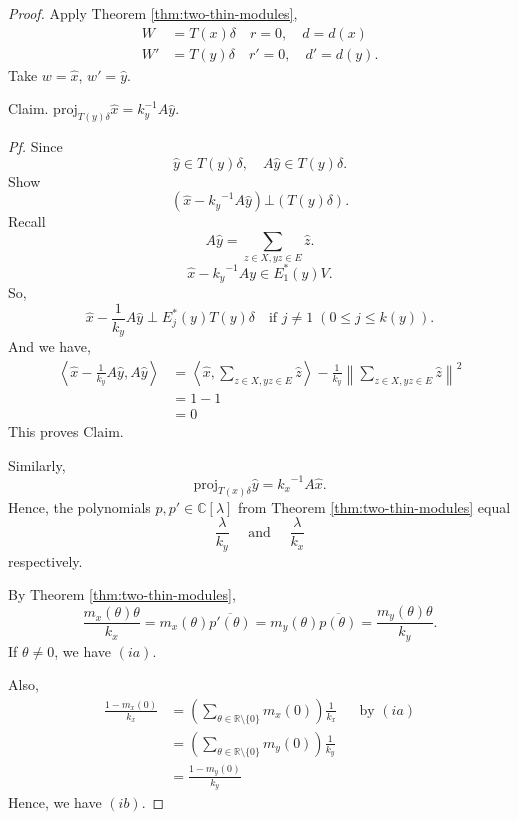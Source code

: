 \documentclass[
]{book}
\theoremstyle{definition}
\theoremstyle{definition}
\theoremstyle{definition}
\theoremstyle{definition}
\theoremstyle{remark}
\begin{document}
\begin{proof}
Apply Theorem \ref{thm:two-thin-modules},
\begin{align}
W & = T(x)\delta \quad r = 0, \quad d = d(x)\\
W' & = T(y)\delta \quad r' = 0, \quad d' = d(y).
\end{align}
Take \(w = \hat{x}\), \(w' = \hat{y}\).

Claim. \(\mathrm{proj}_{T(y)\delta}\hat{x} = k^{-1}_yA\hat{y}\).

\emph{Pf.}
Since
\[\hat{y}\in T(y)\delta, \quad A\hat{y}\in T(y)\delta.\]
Show
\[(\hat{x} - {k_y}^{-1} A\hat{y}) \bot (T(y)\delta).\]
Recall
\[A\hat{y} = \sum_{z\in X, yz\in E}\hat{z}.\]
\[\hat{x} - {k_y}^{-1}Ay \in E^*_1(y)V.\]
So,
\[\hat{x} - \frac{1}{k_y}A\hat{y} \; \bot \; E^*_j(y)T(y)\delta \quad \text{if $j\neq 1$}\; (0\leq j\leq k(y)).\]
And we have,
\begin{align}
\left\langle \hat{x} - \frac{1}{k_y}A\hat{y}, A\hat{y}\right\rangle
& = \left\langle \hat{x}, \sum_{z\in X, yz\in E}\hat{z}\right\rangle - \frac{1}{k_y}\left\|\sum_{z\in X, yz\in E}\hat{z}\right\|^2\\
& =  1 - 1\\
& = 0
\end{align}
This proves Claim.

Similarly,
\[\mathrm{proj}_{T(x)\delta}\hat{y} = {k_x}^{-1}A\hat{x}.\]
Hence, the polynomials \(p, p'\in \mathbb{C}[\lambda]\) from Theorem \ref{thm:two-thin-modules} equal
\[\frac{\lambda}{k_y} \quad \text{ and }\quad \frac{\lambda}{k_x}\]
respectively.

By Theorem \ref{thm:two-thin-modules},
\[\frac{m_x(\theta)\theta}{k_x} = m_x(\theta)\overline{p'(\theta)} = m_y(\theta)\overline{p(\theta)} = \frac{m_y(\theta)\theta}{k_y}.\]
If \(\theta\neq 0\), we have \((ia)\).

Also,
\begin{align}
\frac{1-m_x(0)}{k_x} & = \left(\sum_{\theta\in \mathbb{R}\setminus \{0\}}m_x(0)\right)\frac{1}{k_x} && \text{by $(ia)$}\\
& = \left(\sum_{\theta\in \mathbb{R}\setminus \{0\}}m_y(0)\right)\frac{1}{k_y}\\
& = \frac{1 - m_y(0)}{k_y}
\end{align}
Hence, we have \((ib)\).
\end{proof}
\end{document}
